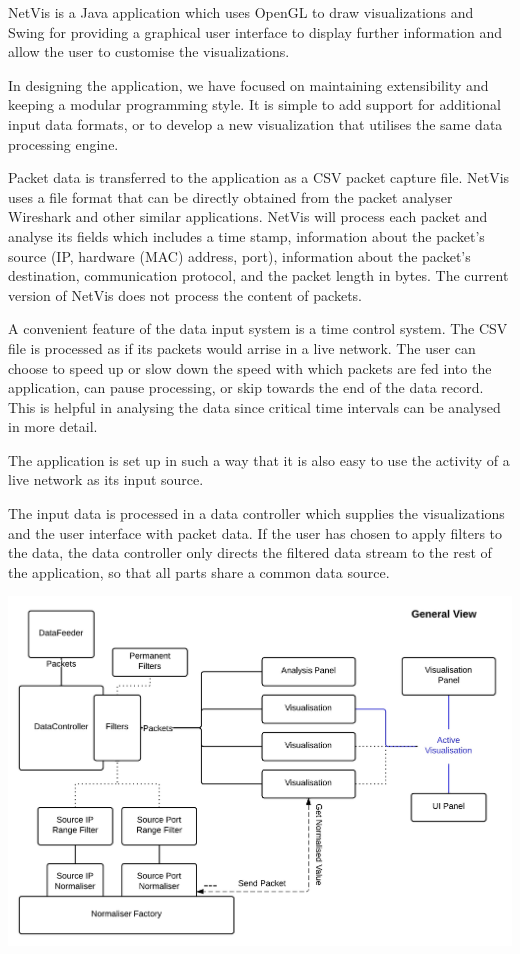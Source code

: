 NetVis is a Java application which uses OpenGL to draw visualizations and Swing for providing a graphical user interface to display further information and allow the user to customise the visualizations.

In designing the application, we have focused on maintaining extensibility and keeping a modular programming style. It is simple to add support for additional input data formats, or to develop a new visualization that utilises the same data processing engine.

Packet data is transferred to the application as a CSV packet capture file. NetVis uses a file format that can be directly obtained from the packet analyser Wireshark and other similar applications. NetVis will process each packet and analyse its fields which includes a time stamp, information about the packet's source (IP, hardware (MAC) address, port), information about the packet's destination, communication protocol, and the packet length in bytes.
The current version of NetVis does not process the content of packets.

A convenient feature of the data input system is a time control system. The CSV file is processed as if its packets would arrise in a live network. The user can choose to speed up or slow down the speed with which packets are fed into the application, can pause processing, or skip towards the end of the data record. This is helpful in analysing the data since critical time intervals can be analysed in more detail.

The application is set up in such a way that it is also easy to use the activity of a live network as its input source.

The input data is processed in a data controller which supplies the visualizations and the user interface with packet data. If the user has chosen to apply filters to the data, the data controller only directs the filtered data stream to the rest of the application, so that all parts share a common data source.

\includegraphics[width=\linewidth]{materials/architecture.jpg}


